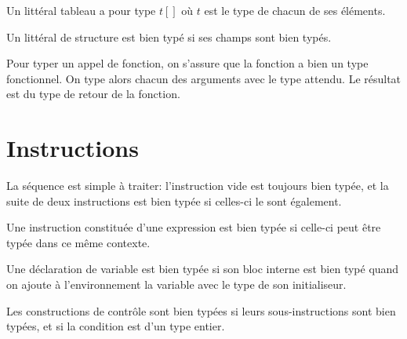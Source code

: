 \begin{mathpar}
\end{mathpar}

Un littéral tableau a pour type $t[]$ où $t$ est le type de chacun de ses
éléments.

\begin{mathpar}
\end{mathpar}

Un littéral de structure est bien typé si ses champs sont bien typés.

\begin{mathpar}
\end{mathpar}

Pour typer un appel de fonction, on s'assure que la fonction a bien un type
fonctionnel. On type alors chacun des arguments avec le type attendu. Le
résultat est du type de retour de la fonction.

\begin{mathpar}
\end{mathpar}

\section{Instructions}

La séquence est simple à traiter: l'instruction vide est toujours bien typée,
et la suite de deux instructions est bien typée si celles-ci le sont également.

\begin{mathpar}

\end{mathpar}

Une instruction constituée d'une expression est bien typée si celle-ci peut être
typée dans ce même contexte.

\begin{mathpar}
\end{mathpar}

Une déclaration de variable est bien typée si son bloc interne est bien typé
quand on ajoute à l'environnement la variable avec le type de son initialiseur.

\begin{mathpar}
\end{mathpar}

Les constructions de contrôle sont bien typées si leurs sous-instructions sont
bien typées, et si la condition est d'un type entier.

